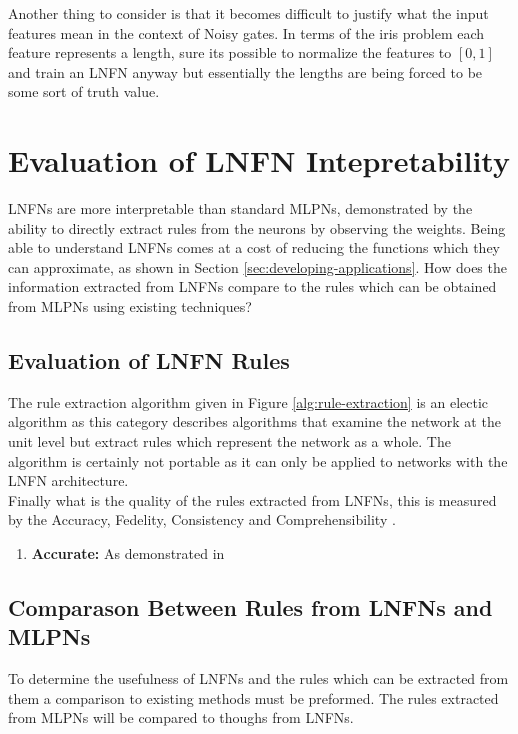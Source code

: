 Another thing to consider is that it becomes difficult to justify what the input features mean in the context of Noisy gates. In terms of the iris problem each feature represents a length, sure its possible to normalize the features to $[0,1]$ and train an LNFN anyway but essentially the lengths are being forced to be some sort of truth value.


\section{Evaluation of LNFN Intepretability}
LNFNs are more interpretable than standard MLPNs, demonstrated by the ability to directly extract rules from the neurons by observing the weights. Being able to understand LNFNs comes at a cost of reducing the functions which they can approximate, as shown in Section \ref{sec:developing-applications}. How does the information extracted from LNFNs compare to the rules which can be obtained from MLPNs using existing techniques?

\subsection{Evaluation of LNFN Rules}
The rule extraction algorithm given in Figure \ref{alg:rule-extraction} is an electic algorithm as this category describes algorithms that examine the network at the unit level but extract rules which represent the network as a whole. The algorithm is certainly not portable as it can only be applied to networks with the LNFN architecture.\\

Finally what is the quality of the rules extracted from LNFNs, this is measured by the Accuracy, Fedelity, Consistency and Comprehensibility \cite{andrews1995survey}.

\begin{enumerate}
	\item \textbf{Accurate:} As demonstrated in 
\end{enumerate}

\subsection{Comparason Between Rules from LNFNs and MLPNs}
To determine the usefulness of LNFNs and the rules which can be extracted from them a comparison to existing methods must be preformed. The rules extracted from MLPNs will be compared to thoughs from LNFNs.

